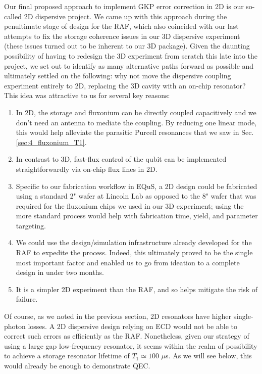 Our final proposed approach to implement GKP error correction in 2D is our so-called 2D dispersive project. We came up with this approach during the penultimate stage of design for the RAF, which also coincided with our last attempts to fix the storage coherence issues in our 3D dispersive experiment (these issues turned out to be inherent to our 3D package). Given the daunting possibility of having to redesign the 3D experiment from scratch this late into the project, we set out to identify as many alternative paths forward as possible and ultimately settled on the following: why not move the dispersive coupling experiment entirely to 2D, replacing the 3D cavity with an on-chip resonator? This idea was attractive to us for several key reasons: 
\begin{enumerate}
    \item In 2D, the storage and fluxonium can be directly coupled capacitively and we don't need an antenna to mediate the coupling. By reducing one linear mode, this would help alleviate the parasitic Purcell resonances that we saw in  Sec. \ref{sec:4_fluxonium_T1}.
    \item In contrast to 3D, fast-flux control of the qubit can be implemented straightforwardly via on-chip flux lines in 2D. 
    \item Specific to our fabrication workflow in EQuS, a 2D design could be fabricated using a standard 2" wafer at Lincoln Lab as opposed to the 8" wafer that was required for the fluxonium chips we used in our 3D experiment; using the more standard process would help with fabrication time, yield, and parameter targeting. 
    \item We could use the design/simulation infrastructure already developed for the RAF to expedite the process. Indeed, this ultimately proved to be the single most important factor and enabled us to go from ideation to a complete design in under two months. 
    \item It is a simpler 2D experiment than the RAF, and so helps mitigate the risk of failure. 
\end{enumerate}

Of course, as we noted in the previous section, 2D resonators have higher single-photon losses. A 2D dispersive design relying on ECD would not be able to correct such errors as efficiently as the RAF. Nonetheless, given our strategy of using a large gap low-frequency resonator, it seems within the realm of possibility to achieve a storage resonator lifetime of $T_1 \simeq 100$ $\mu$s. As we will see below, this would already be enough to demonstrate QEC. 

